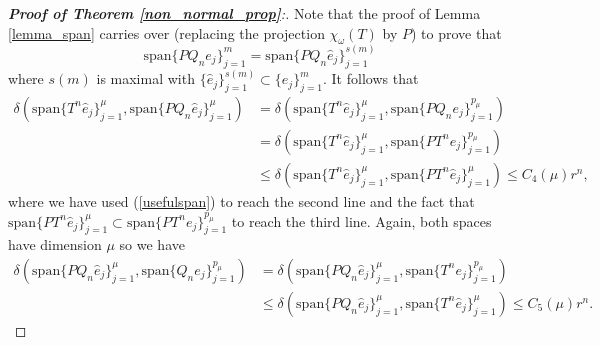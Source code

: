 \documentclass[a4paper,10pt]{article}
\begin{document}
\begin{proof}[\textbf{Proof of Theorem \ref{non_normal_prop}}:]
Note that the proof of Lemma \ref{lemma_span} carries over (replacing the projection $\chi_{\omega}(T)$ by $P$) to prove that
\begin{equation}
\label{ext_lemma}
\mathrm{span}\{PQ_ne_j\}_{j=1}^m=\mathrm{span}\{PQ_n\hat e_j\}_{j=1}^{s(m)}
\end{equation}
where $s(m)$ is maximal with $\{\hat e_j\}_{j=1}^{s(m)}\subset\{e_j\}_{j=1}^m$. It follows that
\begin{align*}
\delta(\mathrm{span}\{T^n\hat e_j\}_{j=1}^\mu,\mathrm{span}\{PQ_n\hat e_j\}_{j=1}^\mu)&=\delta(\mathrm{span}\{T^n\hat e_j\}_{j=1}^\mu,\mathrm{span}\{PQ_n e_j\}_{j=1}^{p_\mu})\\
&=\delta(\mathrm{span}\{T^n\hat e_j\}_{j=1}^\mu,\mathrm{span}\{PT^n e_j\}_{j=1}^{p_\mu})\\
&\leq\delta(\mathrm{span}\{T^n\hat e_j\}_{j=1}^\mu,\mathrm{span}\{PT^n \hat e_j\}_{j=1}^{\mu})\leq C_4(\mu)r^n,
\end{align*}
where we have used (\ref{usefulspan}) to reach the second line and the fact that $\mathrm{span}\{PT^n \hat e_j\}_{j=1}^{\mu}\subset\mathrm{span}\{PT^n e_j\}_{j=1}^{p_\mu}$ to reach the third line. Again, both spaces have dimension $\mu$ so we have
\begin{equation}
\label{what_we_wnt}
\begin{split}
\delta(\mathrm{span}\{PQ_n\hat e_j\}_{j=1}^\mu,\mathrm{span}\{Q_n e_j\}_{j=1}^{p_\mu})&=\delta(\mathrm{span}\{PQ_n\hat e_j\}_{j=1}^\mu,\mathrm{span}\{T^n e_j\}_{j=1}^{p_\mu})\\
&\leq \delta(\mathrm{span}\{PQ_n\hat e_j\}_{j=1}^\mu,\mathrm{span}\{T^n \hat e_j\}_{j=1}^{\mu})\leq C_5(\mu)r^n.
\end{split}
\end{equation}


\end{proof}
\end{document}
